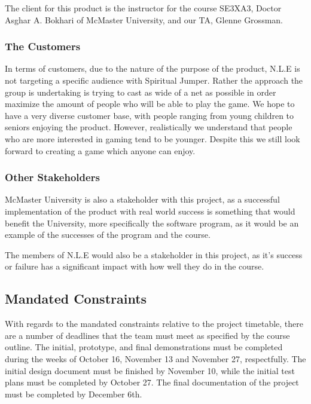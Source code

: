 \documentclass[12pt, titlepage]{article}
\begin{document}
The client for this product is the instructor for the course SE3XA3, Doctor Asghar A. Bokhari of McMaster University, and our TA, Glenne Grossman.

\subsubsection{The Customers}

In terms of customers, due to the nature of the purpose of the product, N.L.E is not targeting a specific audience with Spiritual Jumper. Rather the approach the group is undertaking is trying to cast as wide of a net as possible in order maximize the amount of people who will be able to play the game. We hope to have a very diverse customer base, with people ranging from young children to seniors enjoying the product. However, realistically we understand that people who are more interested in gaming tend to be younger. Despite this we still look forward to creating a game which anyone can enjoy. 

\subsubsection{Other Stakeholders}

McMaster University is also a stakeholder with this project, as a successful implementation of the product with real world success is something that would benefit the University, more specifically the software program, as it would be an example of the successes of the program and the course. 

The members of N.L.E would also be a stakeholder in this project, as it's success or failure has a significant impact with how well they do in the course. 

\subsection{Mandated Constraints}

With regards to the mandated constraints relative to the project timetable, there are a number of deadlines that the team must meet as specified by the course outline. The initial, prototype, and final demonstrations must be completed during the weeks of October 16, November 13 and November 27, respectfully. The initial design document must be finished by November 10, while the initial test plans must be completed by October 27. The final documentation of the project must be completed by December 6th. 
\end{document}
